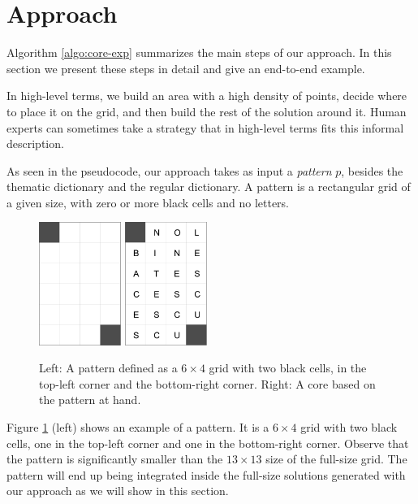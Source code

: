 \section{Approach}

Algorithm \ref{algo:core-exp} summarizes the main steps of our approach.
In this section we present these steps in detail and give an end-to-end example.

In high-level terms, we build an area with a high density of points, decide where to place it on the grid,
and then build the rest of the solution around it.
Human experts can sometimes take a strategy that in high-level terms fits this informal description.

As seen in the pseudocode, our approach takes as input a \emph{pattern} $p$, besides
the thematic dictionary and the regular dictionary.
A {pattern} is a rectangular grid of a given size, with zero or more black cells and no letters.

\begin{figure}
\centering
\includegraphics[height=4cm]{_plots/6x4-puzzle.png} \hspace{1cm}
\includegraphics[height=4cm]{_plots/core-6x4-puzzle.png}
\caption{Left: A pattern defined as a $6 \times 4$ grid with two black cells, in the top-left corner and the bottom-right corner. Right: A core based on the pattern at hand.}
\label{fig:pattern}
\end{figure}

Figure \ref{fig:pattern} (left) shows an example of a pattern. It is a $6 \times 4$ grid with two black cells, one in the top-left corner and one in the bottom-right corner.
Observe that the pattern is significantly smaller than the $13 \times 13$ size of the full-size grid.
The pattern will end up being integrated inside the full-size solutions generated with our approach
as we will show in this section.

